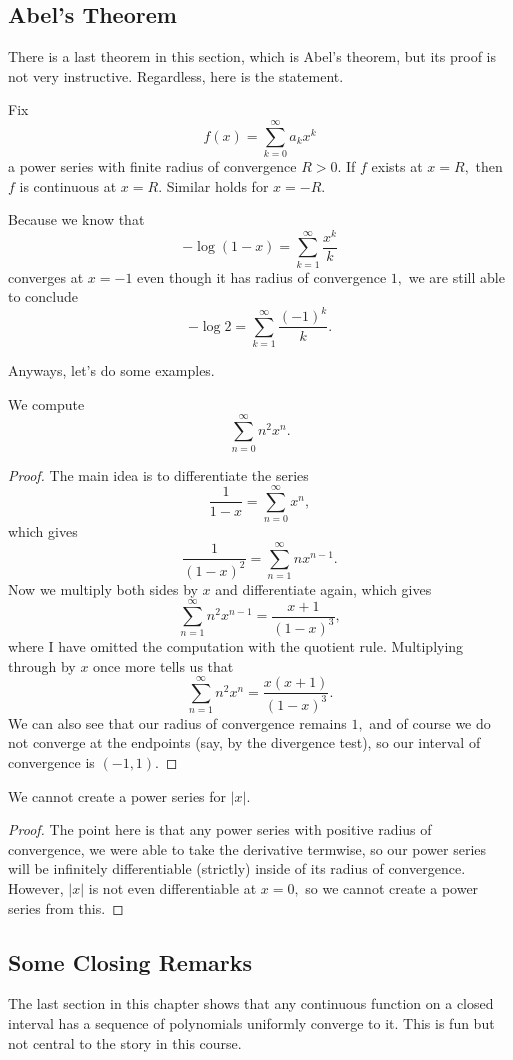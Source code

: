 \documentclass[../notes.tex]{subfiles}
\begin{document}
\subsection{Abel's Theorem}
There is a last theorem in this section, which is Abel's theorem, but its proof is not very instructive. Regardless, here is the statement.
\begin{theorem}
	Fix
	\[f(x)=\sum_{k=0}^\infty a_kx^k\]
	a power series with finite radius of convergence $R>0.$ If $f$ exists at $x=R,$ then $f$ is continuous at $x=R.$ Similar holds for $x=-R.$
\end{theorem}
\begin{example}
	Because we know that
	\[-\log(1-x)=\sum_{k=1}^\infty\frac{x^k}k\]
	converges at $x=-1$ even though it has radius of convergence $1,$ we are still able to conclude
	\[-\log2=\sum_{k=1}^\infty\frac{(-1)^k}k.\]
\end{example}
Anyways, let's do some examples.
\begin{exercise}
	We compute
	\[\sum_{n=0}^\infty n^2x^n.\]
\end{exercise}
\begin{proof}
	The main idea is to differentiate the series
	\[\frac1{1-x}=\sum_{n=0}^\infty x^n,\]
	which gives
	\[\frac1{(1-x)^2}=\sum_{n=1}^\infty nx^{n-1}.\]
	Now we multiply both sides by $x$ and differentiate again, which gives
	\[\sum_{n=1}^\infty n^2x^{n-1}=\frac{x+1}{(1-x)^3},\]
	where I have omitted the computation with the quotient rule. Multiplying through by $x$ once more tells us that
	\[\sum_{n=1}^\infty n^2x^n=\frac{x(x+1)}{(1-x)^3}.\]
	We can also see that our radius of convergence remains $1,$ and of course we do not converge at the endpoints (say, by the divergence test), so our interval of convergence is $(-1,1).$
\end{proof}
\begin{exercise}
	We cannot create a power series for $|x|.$
\end{exercise}
\begin{proof}
	The point here is that any power series with positive radius of convergence, we were able to take the derivative termwise, so our power series will be infinitely differentiable (strictly) inside of its radius of convergence. However, $|x|$ is not even differentiable at $x=0,$ so we cannot create a power series from this.
\end{proof}

\subsection{Some Closing Remarks}
The last section in this chapter shows that any continuous function on a closed interval has a sequence of polynomials uniformly converge to it. This is fun but not central to the story in this course.
\end{document}
